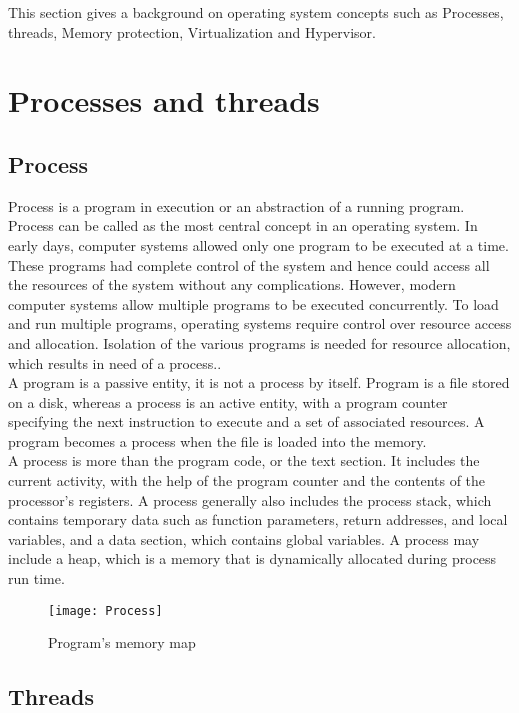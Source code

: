 This section gives a background on operating system concepts such as Processes, threads, Memory protection, Virtualization and Hypervisor.

\section{Processes and threads}

\subsection{Process}

Process is a program in execution or an abstraction of a running program. Process can be called as the most central concept in an operating system. In early days, computer systems allowed only one program to be executed at a time. These programs had complete control of the system and hence could access all the resources of the system without any complications. However, modern computer systems allow multiple programs to be executed concurrently. To load and run multiple programs, operating systems require control over resource access and allocation. Isolation of the various programs is needed for resource allocation, which results in need of a process.\cite{Galvin}.
\\
A program is a passive entity, it is not a process by itself. Program is a file stored on a disk, whereas a process is an active entity, with a program counter specifying the next instruction to execute and a set of associated resources. A program becomes a process when the file is loaded into the memory\cite{Galvin}.
\\
A process is more than the program code, or the text section. It includes the current activity, with the help of the program counter and the contents of the processor's registers. A process generally also includes the process stack, which contains temporary data such as function parameters, return addresses, and local variables, and a data section, which contains global variables. A process may include a heap, which is a memory that is dynamically allocated during process run time\cite{Galvin}.
\begin{figure}[!ht]
\centering
\texttt{[image: Process]}
\caption{Program's memory map}
\label{fig:process}
\end{figure}

\subsection{Threads}

